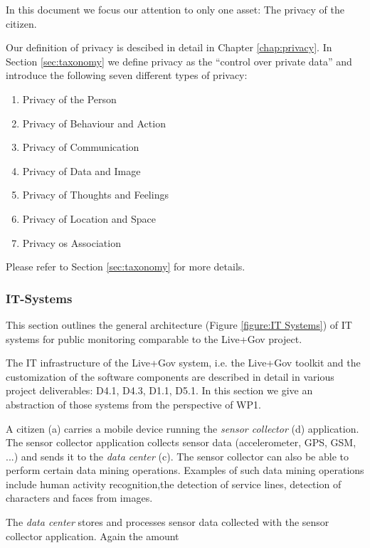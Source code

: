 In this document we focus our attention to only one asset: The privacy of the citizen.

Our definition of privacy is descibed in detail in Chapter \ref{chap:privacy}. In Section \ref{sec:taxonomy} we define privacy as the ``control over private data'' and introduce the following seven different types of privacy:
\begin{enumerate}
\item Privacy of the Person
\item Privacy of Behaviour and Action
\item Privacy of Communication
\item Privacy of Data and Image
\item Privacy of Thoughts and Feelings
\item Privacy of Location and Space
\item Privacy os Association
\end{enumerate}

Please refer to Section \ref{sec:taxonomy} for more details.

\subsubsection{IT-Systems}
\label{subsubsection:it-systems}

This section outlines the general architecture (Figure \ref{figure:IT Systems}) of IT systems for public monitoring comparable to the Live+Gov project.

The IT infrastructure of the Live+Gov system, i.e. the Live+Gov toolkit and the customization of the software components are described in detail in various project deliverables: D4.1, D4.3, D1.1, D5.1.
In this section we give an abstraction of those systems from the perspective of WP1.



A citizen (a) carries a mobile device running the \emph{sensor collector} (d) application.
The sensor collector application collects sensor data (accelerometer, GPS, GSM, ...) and sends it to the \emph{data center} (c).
The sensor collector can also be able to perform certain data mining operations.
Examples of such data mining operations include human activity recognition,the detection of service lines, detection of characters and faces from images.

The \emph{data center} stores and processes sensor data collected with the sensor collector application.
Again the amount 

